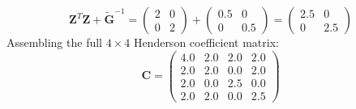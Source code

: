 \documentclass[11pt,twoside,openright]{book}
\begin{document}
$$\mathbf{Z}^T \mathbf{Z} + \widetilde{\mathbf{G}}^{-1} = \begin{pmatrix} 2 & 0 \\ 0 & 2 \end{pmatrix} + \begin{pmatrix} 0.5 & 0 \\ 0 & 0.5 \end{pmatrix} = \begin{pmatrix} 2.5 & 0 \\ 0 & 2.5 \end{pmatrix}$$
Assembling the full $4 \times 4$ Henderson coefficient matrix:
\begin{equation*}
\mathbf{C} = \begin{pmatrix} 
4.0 & 2.0 & 2.0 & 2.0 \\ 
2.0 & 2.0 & 0.0 & 2.0 \\ 
2.0 & 0.0 & 2.5 & 0.0 \\ 
2.0 & 2.0 & 0.0 & 2.5 
\end{pmatrix}
\end{equation*}
\end{document}
